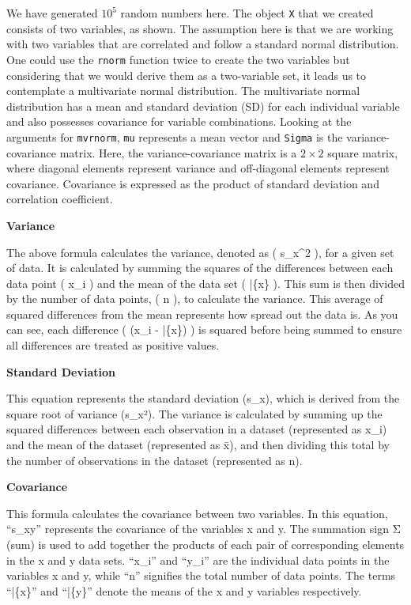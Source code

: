 \documentclass[
  a4paper,
]{book}
\begin{document}
We have generated \ensuremath{10^{5}} random numbers here. The object
\texttt{X} that we created consists of two variables, as shown. The
assumption here is that we are working with two variables that are
correlated and follow a standard normal distribution. One could use the
\texttt{rnorm} function twice to create the two variables but
considering that we would derive them as a two-variable set, it leads us
to contemplate a multivariate normal distribution. The multivariate
normal distribution has a mean and standard deviation (SD) for each
individual variable and also possesses covariance for variable
combinations. Looking at the arguments for \texttt{mvrnorm}, \texttt{mu}
represents a mean vector and \texttt{Sigma} is the variance-covariance
matrix. Here, the variance-covariance matrix is a \(2 \times 2\) square
matrix, where diagonal elements represent variance and off-diagonal
elements represent covariance. Covariance is expressed as the product of
standard deviation and correlation coefficient.

\textbf{Variance}

The above formula calculates the variance, denoted as ( s\_x\^{}2 ), for
a given set of data. It is calculated by summing the squares of the
differences between each data point ( x\_i ) and the mean of the data
set ( \bar\{x\} ). This sum is then divided by the number of data
points, ( n ), to calculate the variance. This average of squared
differences from the mean represents how spread out the data is. As you
can see, each difference ( (x\_i - \bar\{x\}) ) is squared before being
summed to ensure all differences are treated as positive values.

\textbf{Standard Deviation}

This equation represents the standard deviation (s\_x), which is derived
from the square root of variance (s\_x²). The variance is calculated by
summing up the squared differences between each observation in a dataset
(represented as x\_i) and the mean of the dataset (represented as x̄),
and then dividing this total by the number of observations in the
dataset (represented as n).

\textbf{Covariance}

This formula calculates the covariance between two variables. In this
equation, ``s\_xy'' represents the covariance of the variables x and y.
The summation sign Σ (sum) is used to add together the products of each
pair of corresponding elements in the x and y data sets. ``x\_i'' and
``y\_i'' are the individual data points in the variables x and y, while
``n'' signifies the total number of data points. The terms ``\bar\{x\}''
and ``\bar\{y\}'' denote the means of the x and y variables
respectively.
\end{document}
